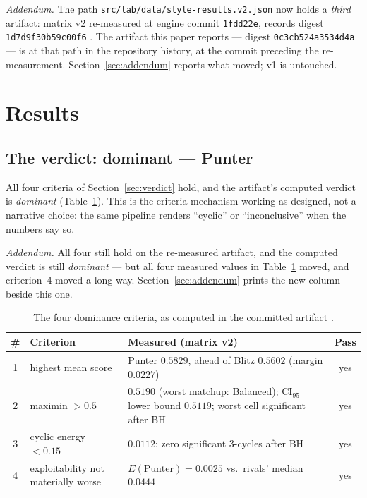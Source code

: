 \documentclass[11pt]{article}
\newcommand{\code}[1]{\texttt{#1}}
\begin{document}
\emph{Addendum.} The path \code{src/lab/data/style-results.v2.json} now holds a \emph{third}
artifact: matrix v2 re-measured at engine commit \code{1fdd22e}, records digest
\code{1d7d9f30b59c00f6} \cite{artifactv2b}. The artifact this paper reports --- digest
\code{0c3cb524a3534d4a} --- is at that path in the repository history, at the commit preceding
the re-measurement. Section~\ref{sec:addendum} reports what moved; v1 is untouched.

\section{Results}
\label{sec:results}

\subsection{The verdict: dominant --- Punter}

All four criteria of Section~\ref{sec:verdict} hold, and the artifact's computed verdict is
\emph{dominant} (Table~\ref{tab:criteria}). This is the criteria mechanism working as
designed, not a narrative choice: the same pipeline renders ``cyclic'' or ``inconclusive''
when the numbers say so.

\emph{Addendum.} All four still hold on the re-measured artifact, and the computed verdict is
still \emph{dominant} --- but all four measured values in Table~\ref{tab:criteria} moved, and
criterion~4 moved a long way. Section~\ref{sec:addendum} prints the new column beside this one.

\begin{table}[t]
\centering
\caption{The four dominance criteria, as computed in the committed artifact \cite{artifact}.}
\label{tab:criteria}
\small
\begin{tabular}{@{}clp{8.2cm}c@{}}
\toprule
\# & Criterion & Measured (matrix v2) & Pass \\
\midrule
1 & highest mean score & Punter $0.5829$, ahead of Blitz $0.5602$ (margin $0.0227$) & yes \\
2 & maximin $> 0.5$ & $0.5190$ (worst matchup: Balanced); CI$_{95}$ lower bound $0.5119$;
    worst cell significant after BH & yes \\
3 & cyclic energy $< 0.15$ & $0.0112$; zero significant 3-cycles after BH & yes \\
4 & exploitability not materially worse & $E(\text{Punter}) = 0.0025$ vs.\ rivals' median
    $0.0444$ & yes \\
\bottomrule
\end{tabular}
\end{table}
\end{document}

